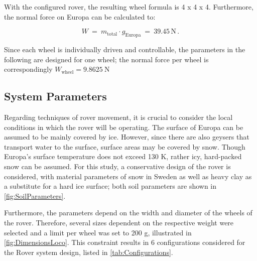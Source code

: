 With the configured rover, the resulting wheel formula is 4 x 4 x 4. Furthermore, the normal force on Europa can be calculated to:

\begin{equation}
	W \:  = \:	m_\text{total} \cdot g_\text{Europa} \:  = \: 39.45 \, \text{N} \, 	.
	\label{eq:}
\end{equation}

Since each wheel is individually driven and controllable, the parameters in the following are designed for one wheel; the normal force per wheel is correspondingly \(W_\text{wheel} = 9.8625 ~\)N

\subsection{System Parameters}
\label{sec:SystemParametersLoco}

Regarding techniques of rover movement, it is crucial to consider the local conditions in which the rover will be operating. The surface of Europa can be assumed to be mainly covered by ice. However, since there are also geysers that transport water to the surface, surface areas may be covered by snow. Though Europa's surface temperature does not exceed 130 K, rather icy, hard-packed snow can be assumed. For this study, a conservative design of the rover is considered, with material parameters of snow in Sweden as well as heavy clay as a substitute for a hard ice surface; both soil parameters are shown in \autoref{fig:SoilParameters}. 

Furthermore, the parameters depend on the width and diameter of the wheels of the rover. Therefore, several sizes dependent on the respective weight were selected and a limit per wheel was set to 200 g, illustrated in \autoref{fig:DimensionsLoco}. This constraint results in 6 configurations considered for the Rover system design, listed in \autoref{tab:Configurations}.

